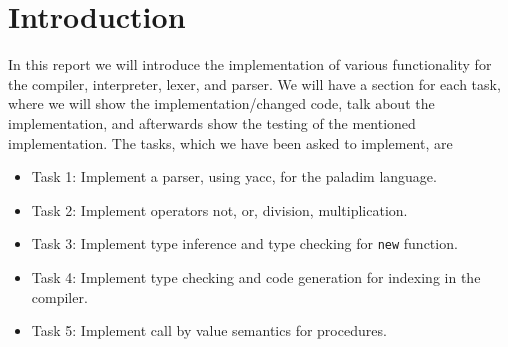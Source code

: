 \section{Introduction}
In this report we will introduce the implementation of various functionality for
the compiler, interpreter, lexer, and parser.
We will have a section for each task, where we will show the implementation/changed code,
talk about the implementation, and afterwards show the testing of the mentioned implementation. 
The tasks, which we have been asked to implement, are 

\begin{itemize}
  \item Task 1: Implement a parser, using yacc, for the paladim language.
  \item Task 2: Implement operators not, or, division, multiplication.
  \item Task 3: Implement type inference and type checking for \verb|new| function.
  \item Task 4: Implement type checking and code generation for indexing in the compiler.
  \item Task 5: Implement call by value semantics for procedures.
\end{itemize}
